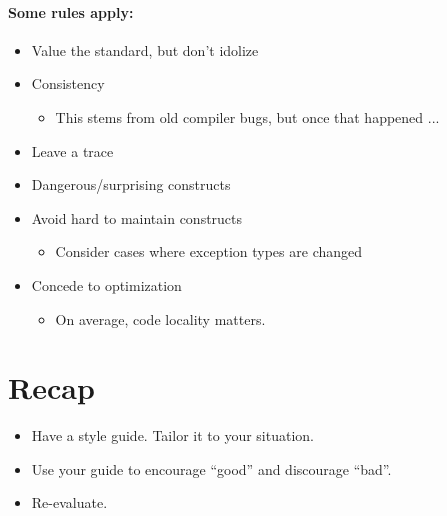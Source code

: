 \paragraph*{Some rules apply:}
\begin{itemize}
    \item Value the standard, but don’t idolize
    \item Consistency
    \begin{itemize}
        \item This stems from old compiler bugs, but once that happened ...
    \end{itemize}
    \item Leave a trace
    \item Dangerous/surprising constructs
    \item Avoid hard to maintain constructs
    \begin{itemize}
        \item Consider cases where exception types are changed
    \end{itemize}
    \item Concede to optimization
    \begin{itemize}
        \item On average, code locality matters.
    \end{itemize}
\end{itemize}

\section{Recap}\label{sec:recap}
\begin{itemize}
    \item Have a style guide. Tailor it to your situation.
    \item Use your guide to encourage \enquote{good} and discourage \enquote{bad}.
    \item Re-evaluate.
\end{itemize}







